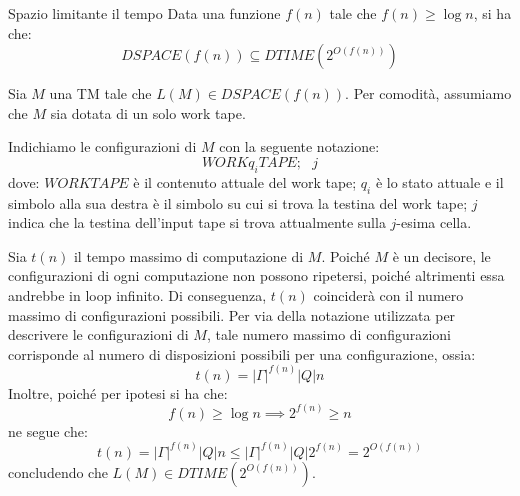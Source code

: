 \begin{Thm}{Spazio limitante il tempo}{}\label{thm:spazio-limitante-tempo}
Data una funzione $f(n)$ tale che $f(n)\geq\log n$, si ha che:
\begin{equation*}
    DSPACE(f(n)) \subseteq DTIME(2^{O(f(n))})
\end{equation*}
\begin{demonstration}
Sia $M$ una TM tale che $L(M)\in DSPACE(f(n))$. Per comodità, assumiamo che $M$ sia dotata di un solo work tape.

Indichiamo le configurazioni di $M$ con la seguente notazione:
\begin{equation*}
    WORKq_iTAPE;\textit{ }j
\end{equation*}
dove: $WORKTAPE$ è il contenuto attuale del work tape; $q_i$ è lo stato attuale e il simbolo alla sua destra è il simbolo su cui si trova la
testina del work tape; $j$ indica che la testina dell’input tape si trova attualmente sulla $j$-esima cella.

Sia $t(n)$ il tempo massimo di computazione di $M$. Poiché $M$ è un decisore, le configurazioni di ogni computazione non possono ripetersi,
poiché altrimenti essa andrebbe in loop infinito. Di conseguenza, $t(n)$ coinciderà con il numero massimo di configurazioni possibili. Per via della notazione utilizzata per descrivere le configurazioni di $M$, tale numero massimo di configurazioni corrisponde al numero di disposizioni possibili per una configurazione, ossia:
\begin{equation*}
    t(n) = |\Gamma|^{f(n)} |Q| n
\end{equation*}
Inoltre, poiché per ipotesi si ha che:
\begin{equation*}
    f(n)\geq\log n\implies 2^{f(n)}\geq n
\end{equation*}
ne segue che:
\begin{equation*}
    t(n) = |\Gamma|^{f(n)}|Q|n\leq|\Gamma|^{f(n)}|Q|2^{f(n)}=2^{O(f(n))}
\end{equation*}
concludendo che $L(M)\in DTIME(2^{O(f(n))})$.
\end{demonstration}
\end{Thm}

